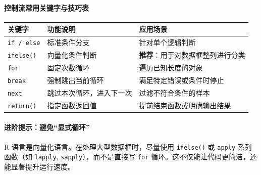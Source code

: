 \paragraph{控制流常用关键字与技巧表}
\begin{table}[h]
\centering
\renewcommand{\arraystretch}{1.5}
\begin{tabular}{|l|l|l|}
\hline
\textbf{关键字} & \textbf{功能说明} & \textbf{应用场景} \\ \hline
\texttt{if / else} & 标准条件分支 & 针对单个逻辑判断 \\ \hline
\texttt{ifelse()} & 向量化条件判断 & \textbf{推荐}：用于对数据框整列进行分类 \\ \hline
\texttt{for} & 固定次数循环 & 遍历已知长度的对象 \\ \hline
\texttt{break} & 强制跳出当前循环 & 满足特定错误或条件时停止 \\ \hline
\texttt{next} & 跳过本次循环，进入下一次 & 过滤不符合条件的样本 \\ \hline
\texttt{return()} & 指定函数返回值 & 提前结束函数或明确输出结果 \\ \hline
\end{tabular}
\end{table}

\paragraph{进阶提示：避免“显式循环”}
R 语言是向量化语言。在处理大型数据框时，尽量使用 \texttt{ifelse()} 或 \texttt{apply} 系列函数（如 \texttt{lapply}, \texttt{sapply}），而不是直接写 \texttt{for} 循环。这不仅能让代码更简洁，还能显著提升运行速度。